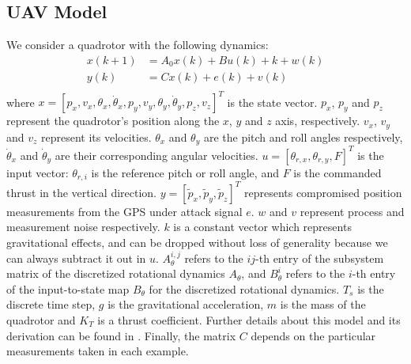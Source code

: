 \documentclass[../../thesis.tex]{subfiles}
\begin{document}

\subsection{UAV Model}

We consider a quadrotor with the following dynamics:
\begin{equation}
\begin{aligned}
x(k+1) &= A_0 x(k) + B u(k)  + k + w(k) \\
y(k) &= C x(k) + e(k) + v(k) \\
\end{aligned}
\end{equation}
where $x = [p_x, v_x, \theta_x, \dot \theta_x, p_y, v_y, \theta_y, \dot\theta_y, p_z, v_z]^T$ is the state vector. $p_x$, $p_y$ and $p_z$ represent the quadrotor's position along the $x$, $y$ and $z$ axis, respectively. $v_x$, $v_y$ and $v_z$ represent its velocities. $\theta_x$ and $\theta_y$ are the pitch and roll angles respectively, $\dot \theta_x$ and $\dot \theta_y$ are their corresponding angular velocities. %
$u = [\theta_{r,x}, \theta_{r,y}, F]^T$ is the input vector: $\theta_{r,i}$ is the reference pitch or roll angle, and $F$ is the commanded thrust in the vertical direction. $y = [\tilde{p}_x, \tilde{p}_y, \tilde{p}_z]^T$ %
represents compromised position measurements from the GPS under attack signal $e$. $w$ and $v$ represent process and measurement noise respectively. $k$ is a constant vector which represents gravitational effects, and can be dropped without loss of generality because we can always subtract it out in $u$. $A_\theta^{i,j}$ refers to the $ij$-th entry of the subsystem matrix of the discretized rotational dynamics $A_\theta$, and $B_\theta^i$ refers to the $i$-th entry of the input-to-state map $B_\theta$ for the discretized rotational dynamics. $T_s$ is the discrete time step, $g$ is the gravitational acceleration, $m$ is the mass of the quadrotor and $K_T$ is a thrust coefficient. Further details about this model and its derivation can be found in \cite{Bouffard}. Finally, the matrix $C$ depends on the particular measurements taken in each example.
\end{document}
